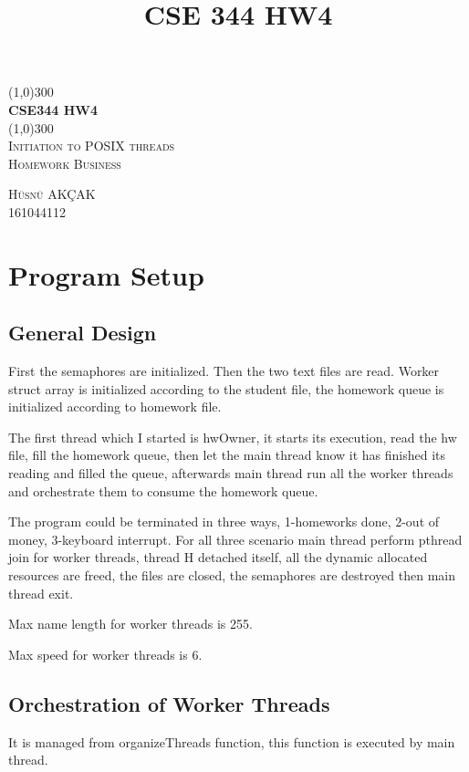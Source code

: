 \documentclass{article}
\title{CSE 344 HW4}
\begin{document}
\begin{titlepage}
	\begin{center}
    \line(1,0){300}\\
    [0.65cm]
	\huge{\bfseries CSE344 HW4}\\
	\line(1,0){300}\\
	\textsc{\Large Initiation to POSIX threads}\\
	\textsc{\LARGE Homework Business}\\
	[5.5cm]     
	\end{center}
	\begin{flushright}
		\textsc{\Large Hüsnü AKÇAK\\161044112}\\
		[0.5cm]
	
	\end{flushright}
\end{titlepage}

\section*{Program Setup}

\subsection*{General Design}
   First the semaphores are initialized.
   Then the two text files are read. Worker struct array is initialized according to the student file, the homework queue is initialized according to homework file.
   
   The first thread which I started is hwOwner, it starts its execution, read the hw file, fill the homework queue, then let the main thread know it has finished its reading and filled the queue, afterwards main thread run all the worker threads and orchestrate them to consume the homework queue.
   
   The program could be terminated in three ways, 1-homeworks done, 2-out of money, 3-keyboard interrupt. For all three scenario main thread perform pthread join for worker threads, thread H detached itself, all the dynamic allocated resources are freed, the files are closed, the semaphores are destroyed then main thread exit.

   Max name length for worker threads is 255.
   
   Max speed for worker threads is 6.

\subsection*{Orchestration of Worker Threads}
    It is managed from organizeThreads function, this function is executed by main thread. 
    
\end{document}
